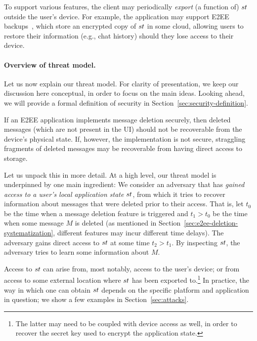 To support various features, the client may periodically \emph{export} (a function of) $st$ outside the user's device. For example, the application may support E2EE backups~\cite{signal-e2ee-backups,whatsapp-e2ee-backups}, which store an encrypted copy of $st$ in some cloud, allowing users to restore their information (e.g., chat history) should they lose access to their device.

\paragraph{Overview of threat model.}Let us now explain our threat model. For clarity of presentation, we keep our discussion here conceptual, in order to focus on the main ideas. Looking ahead, we will provide a formal definition of security in Section~\ref{sec:security-definition}.

If an E2EE application implements message deletion securely, then deleted messages (which are not present in the UI) should not be recoverable from the device's physical state. If, however, the implementation is not secure, straggling fragments of deleted messages may be recoverable from having direct access to storage.


Let us unpack this in more detail. At a high level, our threat model is underpinned by one main ingredient: We consider an adversary that has \emph{gained access to a user's local application state $st$}, from which it tries to recover information about messages that were deleted prior to their access. 
That is, let $t_0$ be the time when a message deletion feature is triggered and $t_1 > t_0$ be the time when some message $M$ is deleted (as mentioned in Section~\ref{sec:e2ee-deletion-systematization}, different features may incur different time delays). The adversary gains direct access to $st$ at some time $t_2 > t_1$. By inspecting $st$, the adversary tries to learn some information about $M$.

Access to $st$ can arise from, most notably, access to the user's device; or from access to some external location where $st$ has been exported to.\footnote{The latter may need to be coupled with device access as well, in order to recover the secret key used to encrypt the application state.} In practice, the way in which one can obtain $st$ depends on the specific platform and application in question; we show a few examples in Section~\ref{sec:attacks}.

